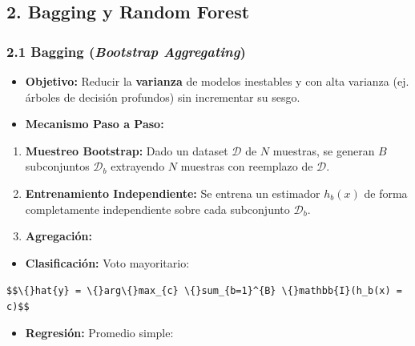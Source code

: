 \documentclass[11pt,oneside]{article}
\begin{document}
\subsection{2. Bagging y Random Forest}

\subsubsection{2.1 Bagging (\emph{Bootstrap Aggregating})}

\begin{itemize}

\item \textbf{Objetivo:} Reducir la \textbf{varianza} de modelos inestables y con alta varianza (ej. árboles de decisión profundos) sin incrementar su sesgo.

\item \textbf{Mecanismo Paso a Paso:}

\end{itemize}

\begin{enumerate}

\item \textbf{Muestreo Bootstrap:} Dado un dataset \(\mathcal{D}\) de \(N\) muestras, se generan \(B\) subconjuntos \(\mathcal{D}_b\) extrayendo \(N\) muestras con reemplazo de \(\mathcal{D}\).

\item \textbf{Entrenamiento Independiente:} Se entrena un estimador \(h_b(x)\) de forma completamente independiente sobre cada subconjunto \(\mathcal{D}_b\).

\item \textbf{Agregación:}

\end{enumerate}

\begin{itemize}

\item \textbf{Clasificación:} Voto mayoritario:

\end{itemize}

\texttt{\$\$\textbackslash\{\}hat\{y\} = \textbackslash\{\}arg\textbackslash\{\}max\_\{c\} \textbackslash\{\}sum\_\{b=1\}\textasciicircum{}\{B\} \textbackslash\{\}mathbb\{I\}(h\_b(x) = c)\$\$}\\

\begin{itemize}

\item \textbf{Regresión:} Promedio simple:

\end{itemize}
\end{document}

